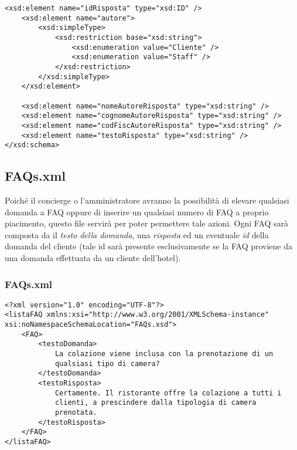 \documentclass [a4paper, 12pt]{book}
\begin{document}
\begin{lstlisting}[style=XML]
    <xsd:element name="idRisposta" type="xsd:ID" />
    <xsd:element name="autore">
        <xsd:simpleType>
            <xsd:restriction base="xsd:string">
                <xsd:enumeration value="Cliente" />
                <xsd:enumeration value="Staff" />
            </xsd:restriction>
        </xsd:simpleType>
    </xsd:element>

    <xsd:element name="nomeAutoreRisposta" type="xsd:string" />
    <xsd:element name="cognomeAutoreRisposta" type="xsd:string" />
    <xsd:element name="codFiscAutoreRisposta" type="xsd:string" />
    <xsd:element name="testoRisposta" type="xsd:string" />
</xsd:schema>
\end{lstlisting}

\subsection{FAQs.xml}
Poiché il concierge o l'amministratore avranno la possibilità di elevare qualsiasi domanda a FAQ oppure di inserire un qualsiasi numero di FAQ a proprio piacimento, questo file servirà per poter permettere tale azioni. Ogni FAQ sarà composta da il \textit{testo della domanda}, una \textit{risposta} ed un eventuale \textit{id} della domanda del cliente (tale id sarà presente esclusivamente se la FAQ proviene da una domanda effettuata da un cliente dell'hotel).

\subsubsection{FAQs.xml}
\begin{lstlisting}[style=XML]
<?xml version="1.0" encoding="UTF-8"?>
<listaFAQ xmlns:xsi="http://www.w3.org/2001/XMLSchema-instance" xsi:noNamespaceSchemaLocation="FAQs.xsd">
    <FAQ>
        <testoDomanda>
            La colazione viene inclusa con la prenotazione di un
            qualsiasi tipo di camera?
        </testoDomanda>
        <testoRisposta>
            Certamente. Il ristorante offre la colazione a tutti i
            clienti, a prescindere dalla tipologia di camera
            prenotata.
        </testoRisposta>
    </FAQ>
</listaFAQ>
\end{lstlisting}
\end{document}

